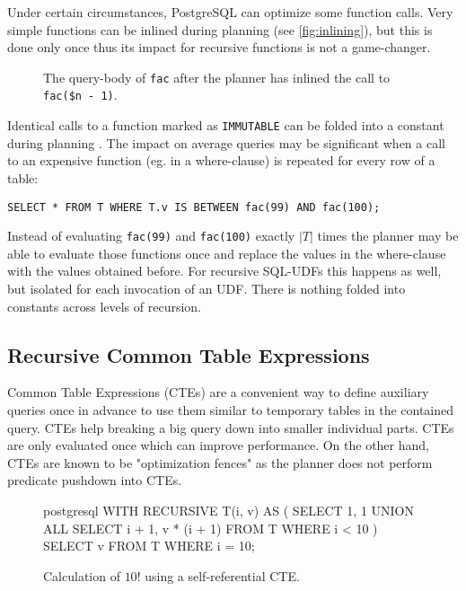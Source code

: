 Under certain circumstances, PostgreSQL can optimize some function calls. Very simple functions can be inlined during planning \cite{psqlWikiUDFinlining} (see \autoref{fig:inlining}), but this is done only once thus its impact for recursive functions is not a game-changer.


\begin{figure}[h!]
    \centering
    \caption{The query-body of \texttt{fac} after the planner has inlined the call to \texttt{fac(\$n - 1)}.}
    \label{fig:inlining}
\end{figure}

Identical calls to a function marked as \texttt{IMMUTABLE} can be folded into a constant during planning \cite[p. 995]{psql}. The impact on average queries may be significant when a call to an expensive function (eg. in a where-clause) is repeated for every row of a table:\\
\begin{verbatim}
SELECT * FROM T WHERE T.v IS BETWEEN fac(99) AND fac(100);
\end{verbatim}
Instead of evaluating \texttt{fac(99)} and \texttt{fac(100)} exactly $|T|$ times the planner may be able to evaluate those functions once and replace the values in the where-clause with the values obtained before. For recursive SQL-UDFs this happens as well, but isolated for each invocation of an UDF. There is nothing folded into constants across levels of recursion.

\subsection{Recursive Common Table Expressions}

Common Table Expressions (CTEs) are a convenient way to define auxiliary queries once in advance to use them similar to temporary tables in the contained query. CTEs help breaking a big query down into smaller individual parts. CTEs are only evaluated once which can improve performance. On the other hand, CTEs are known to be "optimization fences" as the planner does not perform predicate pushdown into CTEs.


\begin{figure}[h!]
    \centering
    \begin{cminted}{postgresql}
WITH RECURSIVE T(i, v) AS (
 SELECT 1, 1
   UNION ALL
 SELECT i + 1, v * (i + 1) FROM T WHERE i < 10
)
SELECT v FROM T WHERE i = 10;
    \end{cminted}
    \caption{Calculation of $10!$ using a self-referential CTE.}
    \label{example:rcte}
\end{figure}


